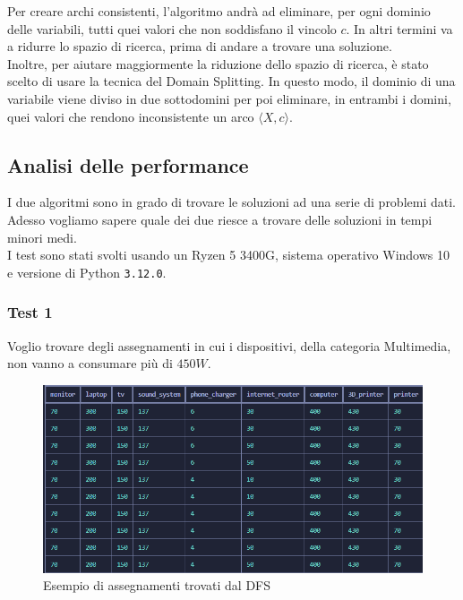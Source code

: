 \documentclass[12pt, letterpaper]{article}
\begin{document}
\noindent Per creare archi consistenti, l'algoritmo andrà ad eliminare, per ogni dominio delle variabili, tutti
quei valori che non soddisfano il vincolo $c$. In altri termini va a ridurre lo spazio di ricerca, prima di
andare a trovare una soluzione. \\

\noindent Inoltre, per aiutare maggiormente la riduzione dello spazio di ricerca, è stato scelto di usare
la tecnica del Domain Splitting. In questo modo, il dominio di una variabile viene diviso in due sottodomini
per poi eliminare, in entrambi i domini, quei valori che rendono inconsistente un arco $\langle X, c \rangle$.

\subsection{Analisi delle performance}

I due algoritmi sono in grado di trovare le soluzioni ad una serie di problemi dati. Adesso vogliamo sapere quale
dei due riesce a trovare delle soluzioni in tempi minori medi. \\

\noindent I test sono stati svolti usando un Ryzen 5 3400G, sistema operativo Windows 10 e
versione di Python \texttt{3.12.0}. \pagebreak


\subsubsection{Test 1}

Voglio trovare degli assegnamenti in cui i dispositivi, della
categoria Multimedia, non vanno a consumare più di $450W$.

\begin{figure}[h]
      \centering
      \includegraphics[scale=0.65]{assegnmanenti-dfs.png}
      \caption{Esempio di assegnamenti trovati dal DFS}
\end{figure}
\end{document}
